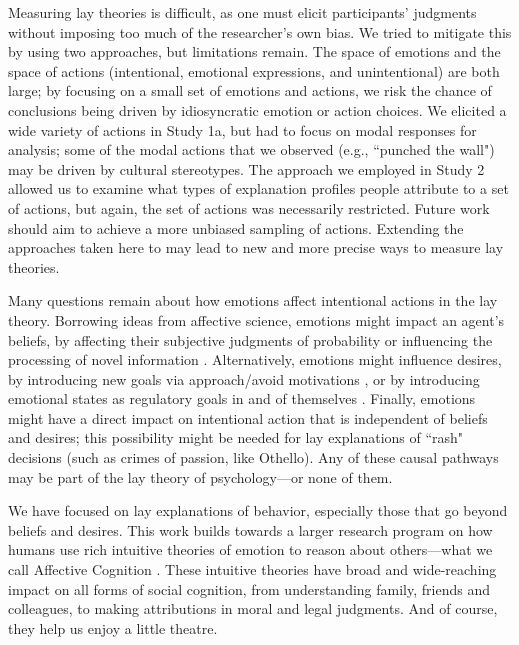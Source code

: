 \documentclass[10pt,letterpaper]{article}
\begin{document}
Measuring lay theories is difficult, as one must elicit participants' judgments without imposing too much of the researcher's own bias. We tried to mitigate this by using two approaches, but limitations remain. The space of emotions and the space of actions (intentional, emotional expressions, and unintentional) are both large; by focusing on a small set of emotions and actions, we risk the chance of conclusions being driven by idiosyncratic emotion or action choices.
We elicited a wide variety of actions in Study 1a, but had to focus on modal responses for analysis; some of the modal actions that we observed (e.g., ``punched the wall") may be driven by cultural stereotypes. The approach we employed in Study 2 allowed us to examine what types of explanation profiles people attribute to a set of actions, but again, the set of actions was necessarily restricted. Future work should aim to achieve a more unbiased sampling of actions. Extending the approaches taken here to may lead to new and more precise ways to measure lay theories.

Many questions remain about how emotions affect intentional actions in the lay theory. Borrowing ideas from affective science, emotions might impact an agent's beliefs, by affecting their subjective judgments of probability \cite{Wright1992} or influencing the processing of novel information \cite{Forgas1995}. Alternatively, emotions might influence desires, by introducing new goals via approach/avoid motivations \cite{Carver2004}, or by introducing emotional states as regulatory goals in and of themselves \cite{Gross2006}. Finally, emotions might have a direct impact on intentional action that is independent of beliefs and desires; this possibility might be needed for lay explanations of ``rash" decisions (such as crimes of passion, like Othello). 
Any of these causal pathways may be part of the lay theory of psychology---or none of them.




We have focused on lay explanations of behavior, especially those that go beyond beliefs and desires. This work builds towards a larger research program on how humans use rich intuitive theories of emotion to reason about others---what we call Affective Cognition \cite{Ong2015AffCog}. These intuitive theories have broad and wide-reaching impact on all forms of social cognition, from understanding family, friends and colleagues, to making attributions in moral and legal judgments. And of course, they help us enjoy a little theatre. 
\end{document}
